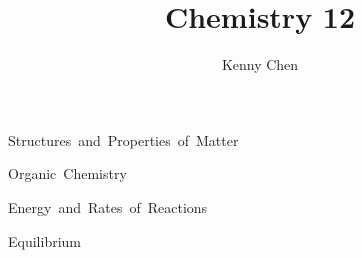 \documentclass[12pt]{report}
\title{Chemistry 12}
\author{Kenny Chen}
\begin{document}
\maketitle
\tableofcontents
\newpage

\unit{Structures and Properties of Matter}










\unit{Organic Chemistry}




\unit{Energy and Rates of Reactions}







\unit{Equilibrium}









\end{document}
